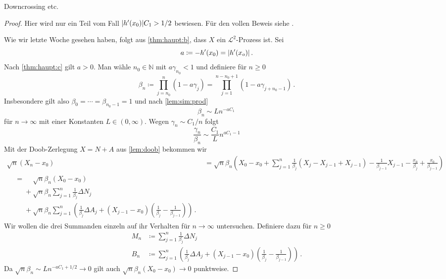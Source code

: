 \documentclass[ngerman,a4paper,11pt]{scrartcl}
\newcommand{\NN}{\mathbb{N}}
\renewcommand{\ll}{\mathcal{L}}
\DeclarePairedDelimiter{\abs}{\lvert}{\rvert}		%
\begin{document}
\begin{rem}
  Downcrossing etc.
\end{rem}
\begin{proof}
  Hier wird nur ein Teil vom Fall $\abs{h'(x_0)}C_1>1/2$ bewiesen. Für
  den vollen Beweis siehe \cite[Satz~11.4]{lpw}.
  
Wie wir letzte Woche gesehen haben, folgt aus \cref{thm:haupt:b}, dass $X$ ein
$\ll^2$-Prozess ist. Sei
\begin{equation*}
 a\coloneqq -h'(x_0)=\abs{h'(x_o)}\,. 
\end{equation*}
Nach \ref{thm:haupt:c} gilt $a>0$. Man wähle $n_0\in\NN$ mit $a\gamma_{n_0}<1$ und
definiere für $n\geq 0$
\begin{equation*}
 \beta_n\coloneqq\prod_{j=n_0}^n(1-a\gamma_j) =\prod_{j=1}^{n-n_0+1}(1-a\gamma_{j+n_0-1})\,.
\end{equation*}
Insbesondere gilt also $\beta_0=\dotsb=\beta_{n_0-1}=1$ und nach \cref{lem:sim:prod}
\begin{equation}\label{eq:beta}
 \beta_n\sim Ln^{-aC_1}\,
\end{equation}
für $n\to\infty$ mit einer Konstanten $L\in(0,\infty)$. Wegen $\gamma_n\sim
C_1/n$ folgt
\begin{equation}
  \frac{\gamma_n}{\beta_n}\sim\frac{C_1}{L}n^{aC_1-1}\label{eq:gammabeta}
\end{equation}
Mit der Doob-Zerlegung $X=N+A$ aus \cref{lem:doob} bekommen wir
\begin{align}
  \sqrt{n}(X_n-x_0)&=\sqrt{n}\beta_n\left(X_0-x_0+\sum_{j=1}^n\frac{1}{\beta_j}(X_j - X_{j-1} + X_{j-1})-\frac{1}{\beta_{j-1}}X_{j-1}-\frac{x_0}{\beta_j}+\frac{x_0}{\beta_{j-1}}\right)\nonumber \\
  \begin{split}\label{eq:zerl}
&=\phantom{+}\sqrt{n}\beta_n(X_0-x_0)\\
&\phantom{=}+\sqrt{n}\beta_n\sum_{j=1}^n\frac{1}{\beta_j}\Delta N_j\\
&\phantom{=}+\sqrt{n}\beta_n\sum_{j=1}^n\left(\frac{1}{\beta_j}\Delta A_j+(X_{j-1}-x_0)(\frac{1}{\beta_j}-\frac{1}{\beta_{j-1}})\right)\,. 
\end{split}
\end{align}
Wir wollen die drei Summanden einzeln auf ihr Verhalten für $n\to\infty$
untersuchen. Definiere dazu für $n\geq 0$
\begin{align*}
 M_n&\coloneqq \sum_{j=1}^n\frac{1}{\beta_j}\Delta N_j\\
B_n&\coloneqq\sum_{j=1}^n\left(\frac{1}{\beta_j}\Delta A_j+(X_{j-1}-x_0)(\frac{1}{\beta_j}-\frac{1}{\beta_{j-1}})\right)\,.
\end{align*}
Da $\sqrt{n}\beta_n\sim Ln^{-aC_1+1/2}\to 0$ gilt auch
$\sqrt{n}\beta_n(X_0-x_0)\to 0$ punktweise.


\end{proof}
\end{document}
